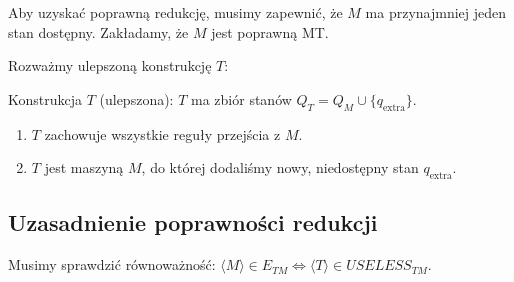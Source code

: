 \documentclass{article}
\begin{document}
Aby uzyskać poprawną redukcję, musimy zapewnić, że $M$ ma przynajmniej jeden stan dostępny. Zakładamy, że $M$ jest poprawną MT.

Rozważmy ulepszoną konstrukcję $T$:

Konstrukcja $T$ (ulepszona):
$T$ ma zbiór stanów $Q_T = Q_M \cup \{q_{\mathrm{extra}}\}$.
\begin{enumerate}
    \item $T$ zachowuje wszystkie reguły przejścia z $M$.
    \item $T$ jest maszyną $M$, do której dodaliśmy nowy, niedostępny stan $q_{\mathrm{extra}}$.
\end{enumerate}

\subsection*{Uzasadnienie poprawności redukcji}

Musimy sprawdzić równoważność: $\langle M \rangle \in E_{TM} \iff \langle T \rangle \in USELESS_{TM}$.
\end{document}
